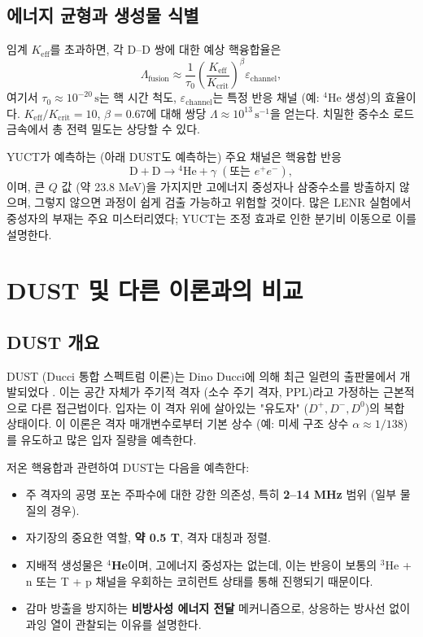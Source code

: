 \documentclass[11pt,a4paper]{article}
\theoremstyle{remark}
\newcommand{\Keff}{K_{\mathrm{eff}}}
\newcommand{\Kcrit}{K_{\mathrm{crit}}}
\begin{document}
	\subsection{에너지 균형과 생성물 식별}
	
	임계 \(\Keff\)를 초과하면, 각 D–D 쌍에 대한 예상 핵융합율은
	\begin{equation}
		\Lambda_{\text{fusion}} \approx \frac{1}{\tau_0} \left( \frac{\Keff}{\Kcrit} \right)^{\beta} \varepsilon_{\text{channel}},
		\label{eq:fusion-rate}
	\end{equation}
	여기서 \(\tau_0 \approx 10^{-20}\,\text{s}\)는 핵 시간 척도, \(\varepsilon_{\text{channel}}\)는 특정 반응 채널 (예: \(^4\)He 생성)의 효율이다. \(\Keff/\Kcrit = 10\), \(\beta = 0.67\)에 대해 쌍당 \(\Lambda \approx 10^{13}\,\text{s}^{-1}\)을 얻는다. 치밀한 중수소 로드 금속에서 총 전력 밀도는 상당할 수 있다.
	
	YUCT가 예측하는 (아래 DUST도 예측하는) 주요 채널은 핵융합 반응
	\[
	\mathrm{D} + \mathrm{D} \to {}^4\mathrm{He} + \gamma\;(\text{또는 } e^+e^-),
	\]
	이며, 큰 \(Q\) 값 (약 23.8 MeV)을 가지지만 고에너지 중성자나 삼중수소를 방출하지 않으며, 그렇지 않으면 과정이 쉽게 검출 가능하고 위험할 것이다. 많은 LENR 실험에서 중성자의 부재는 주요 미스터리였다; YUCT는 조정 효과로 인한 분기비 이동으로 이를 설명한다.
	
	\section{DUST 및 다른 이론과의 비교}
	\label{sec:comparison}
	
	\subsection{DUST 개요}
	
	DUST (Ducci 통합 스펙트럼 이론)는 Dino Ducci에 의해 최근 일련의 출판물에서 개발되었다 \cite{Ducci2025,Ducci2026a,Ducci2026b}. 이는 공간 자체가 주기적 격자 (소수 주기 격자, PPL)라고 가정하는 근본적으로 다른 접근법이다. 입자는 이 격자 위에 살아있는 "유도자" (\(D^+, D^-, D^0\))의 복합 상태이다. 이 이론은 격자 매개변수로부터 기본 상수 (예: 미세 구조 상수 \(\alpha \approx 1/138\))를 유도하고 많은 입자 질량을 예측한다.
	
	저온 핵융합과 관련하여 DUST는 다음을 예측한다:
	\begin{itemize}
		\item 주 격자의 공명 포논 주파수에 대한 강한 의존성, 특히 \textbf{2–14 MHz} 범위 (일부 물질의 경우).
		\item 자기장의 중요한 역할, \textbf{약 0.5 T}, 격자 대칭과 정렬.
		\item 지배적 생성물은 \textbf{\(^4\)He}이며, 고에너지 중성자는 없는데, 이는 반응이 보통의 \(^3\)He + n 또는 T + p 채널을 우회하는 코히런트 상태를 통해 진행되기 때문이다.
		\item 감마 방출을 방지하는 \textbf{비방사성 에너지 전달} 메커니즘으로, 상응하는 방사선 없이 과잉 열이 관찰되는 이유를 설명한다.
	\end{itemize}
	
\end{document}
